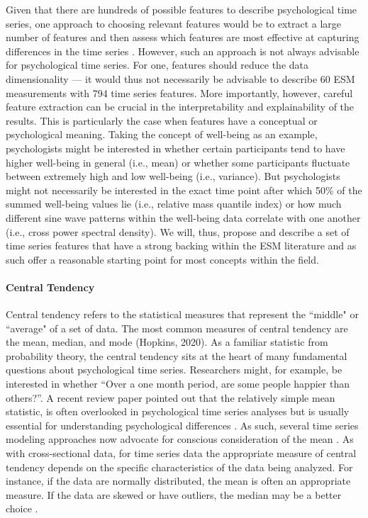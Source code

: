 \documentclass[man, 12pt, a4paper, mask, floatsintext]{apa7}
\theoremstyle{break}
\theoremstyle{plain}
\begin{document}
Given that there are hundreds of possible features to describe psychological time series, one approach to choosing relevant features would be to extract a large number of features and then assess which features are most effective at capturing differences in the time series \citep[e.g.,][]{christ2018}. However, such an approach is not always advisable for psychological time series. For one, features should reduce the data dimensionality --- it would thus not necessarily be advisable to describe 60 ESM measurements with 794 time series features. More importantly, however, careful feature extraction can be crucial in the interpretability and explainability of the results. This is particularly the case when features have a conceptual or psychological meaning. Taking the concept of well-being as an example, psychologists might be interested in whether certain participants tend to have higher well-being in general (i.e., mean) or whether some participants fluctuate between extremely high and low well-being (i.e., variance). But psychologists might not necessarily be interested in the exact time point after which 50\% of the summed well-being values lie (i.e., relative mass quantile index) or how much different sine wave patterns within the well-being data correlate with one another (i.e., cross power spectral density). We will, thus, propose and describe a set of time series features that have a strong backing within the ESM literature and as such offer a reasonable starting point for most concepts within the field.



\paragraph{Central Tendency} Central tendency refers to the statistical measures that represent the ``middle" or ``average" of a set of data. The most common measures of central tendency are the mean, median, and mode (Hopkins, 2020). As a familiar statistic from probability theory, the central tendency sits at the heart of many fundamental questions about psychological time series. Researchers might, for example, be interested in whether ``Over a one month period, are some people happier than others?''. A recent review paper pointed out that the relatively simple mean statistic, is often overlooked in psychological time series analyses but is usually essential for understanding psychological differences \citep{bringmann2018c}. As such, several time series modeling approaches now advocate for conscious consideration of the mean \citep[e.g.,][]{bringmann2017a}. As with cross-sectional data, for time series data the appropriate measure of central tendency depends on the specific characteristics of the data being analyzed. For instance, if the data are normally distributed, the mean is often an appropriate measure. If the data are skewed or have outliers, the median may be a better choice \citep{weisberg1992}.
\end{document}

